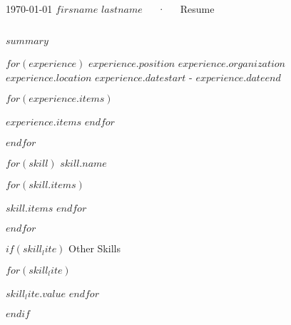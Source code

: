 \documentclass[11pt, a4paper]{awesome-cv}
\begin{document}
\makecvheader[C]

\makecvfooter
  {\today}
  {$firsname$ $lastname$~~~·~~~Resume}
  {\thepage}


\begin{cvparagraph}
\\
$summary$
\end{cvparagraph}


\begin{cventries}
$for(experience)$
  \cventry
    {$experience.position$} %
    {$experience.organization$} %
    {$experience.location$} %
    {$experience.datestart$ - $experience.dateend$} %
    {
      \begin{cvitems} %
        $for(experience.items)$
        \item{$experience.items$}
        $endfor$
      \end{cvitems}
    }
    \linebreak
$endfor$
\end{cventries}

\begin{cventries}

$for(skill)$
  \cventry
    {$skill.name$}{}{}{} %
    {
      \begin{cvitems} %
        $for(skill.items)$
        \item{$skill.items$}
        $endfor$
      \end{cvitems}
    }
$endfor$

$if(skill_lite)$
\cventry
  {Other Skills}
  {
    \begin{cvitems} %
      $for(skill_lite)$
      \item {$skill_lite.value$}
      $endfor$
    \end{cvitems}
  }
$endif$



\end{cventries}
\end{document}
